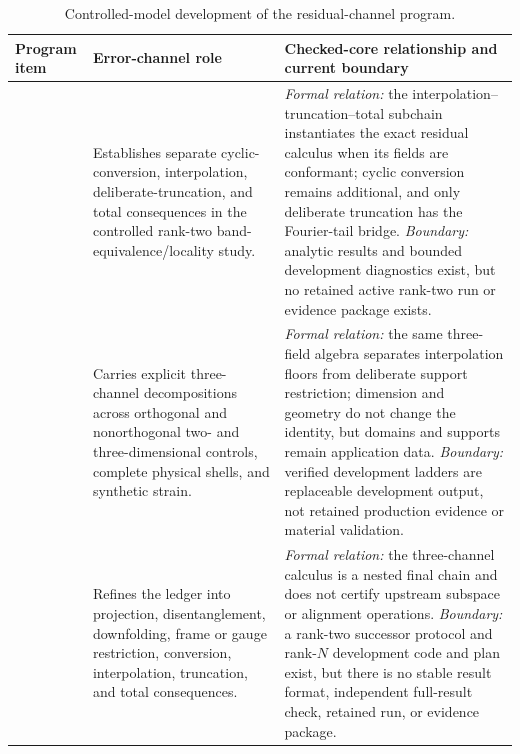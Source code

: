 \begin{table}[ht]
\centering
\footnotesize
\begin{tabularx}{\textwidth}{@{}l Y Y@{}}
\toprule
Program item & Error-channel role & Checked-core relationship and current boundary \\
\midrule
{}
  & Establishes separate cyclic-conversion, interpolation, deliberate-truncation, and
    total consequences in the controlled rank-two band-equivalence/locality study.
  & \emph{Formal relation:} the interpolation--truncation--total subchain instantiates
    the exact residual calculus when its fields are conformant; cyclic conversion
    remains additional, and only deliberate truncation has the Fourier-tail bridge.
    \emph{Boundary:} analytic results and bounded development diagnostics exist, but no
    retained active rank-two run or evidence package exists. \\
  & Carries explicit three-channel decompositions across orthogonal and nonorthogonal
    two- and three-dimensional controls, complete physical shells, and synthetic
    strain.
  & \emph{Formal relation:} the same three-field algebra separates interpolation floors
    from deliberate support restriction; dimension and geometry do not change the
    identity, but domains and supports remain application data.  \emph{Boundary:}
    verified development ladders are replaceable development output, not retained
    production evidence or material validation. \\
  & Refines the ledger into projection, disentanglement, downfolding, frame or gauge
    restriction, conversion, interpolation, truncation, and total consequences.
  & \emph{Formal relation:} the three-channel calculus is a nested final chain and does
    not certify upstream subspace or alignment operations.  \emph{Boundary:} a rank-two
    successor protocol and rank-$N$ development code and plan exist, but there is no
    stable result format, independent full-result check, retained run, or evidence
    package. \\
\bottomrule
\end{tabularx}
\caption{Controlled-model development of the residual-channel program.}
\label{tab:seven-paper-error-channel-crosswalk-controls}
\end{table}
\FloatBarrier


